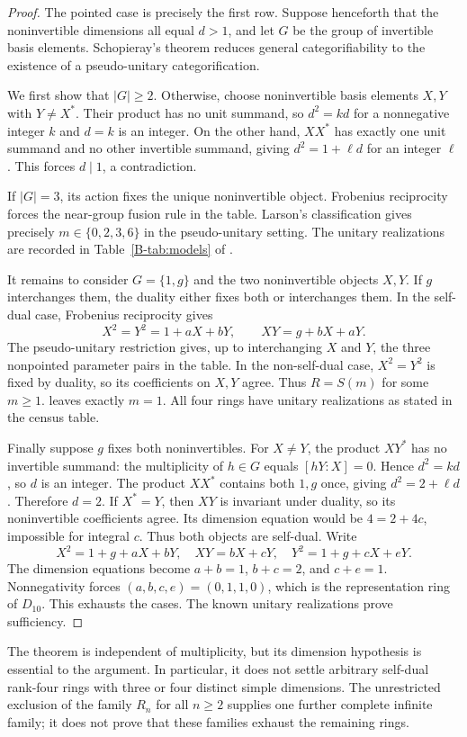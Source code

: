 \begin{proof}
The pointed case is precisely the first row. Suppose henceforth that the
noninvertible dimensions all equal $d>1$, and let $G$ be the group of
invertible basis elements. Schopieray's theorem
\cite[Lemma~3.1]{Schopieray} reduces general categorifiability to the
existence of a pseudo-unitary categorification.

We first show that $|G|\geq2$. Otherwise, choose noninvertible basis
elements $X,Y$ with $Y\ne X^*$. Their product has no unit summand, so
$d^2=kd$ for a nonnegative integer $k$ and $d=k$ is an integer. On the
other hand, $XX^*$ has exactly one unit summand and no other invertible
summand, giving $d^2=1+\ell d$ for an integer $\ell$. This forces $d\mid1$,
a contradiction.

If $|G|=3$, its action fixes the unique noninvertible object. Frobenius
reciprocity forces the near-group fusion rule in the table. Larson's
classification \cite[Theorem~1.1]{Larson} gives precisely
$m\in\{0,2,3,6\}$ in the pseudo-unitary setting. The unitary realizations
are recorded in Table~\ref{B-tab:models} of \cite{Finite}.

It remains to consider $G=\{1,g\}$ and the two noninvertible objects $X,Y$.
If $g$ interchanges them, the duality either fixes both or interchanges
them. In the self-dual case, Frobenius reciprocity gives
\[
 X^2=Y^2=1+aX+bY,\qquad XY=g+bX+aY.
\]
The pseudo-unitary restriction
\cite[Theorem~2.4]{EIP} gives, up to interchanging $X$ and $Y$, the
three nonpointed parameter pairs in the table. In the non-self-dual case,
$X^2=Y^2$ is fixed by duality, so its coefficients on $X,Y$ agree. Thus
$R=S(m)$ for some $m\geq1$. \cite[Theorem~\ref{B-thm:nonselfdual-quadratic}]{Finite}
leaves exactly $m=1$. All four rings have unitary realizations as stated
in the census table.

Finally suppose $g$ fixes both noninvertibles. For $X\ne Y$, the product
$XY^*$ has no invertible summand: the multiplicity of $h\in G$ equals
$[hY:X]=0$. Hence $d^2=kd$, so $d$ is an integer. The product $XX^*$
contains both $1,g$ once, giving $d^2=2+\ell d$. Therefore $d=2$.
If $X^*=Y$, then $XY$ is invariant under duality, so its noninvertible
coefficients agree. Its dimension equation would be $4=2+4c$, impossible
for integral $c$. Thus both objects are self-dual. Write
\[
 X^2=1+g+aX+bY,\quad XY=bX+cY,\quad
 Y^2=1+g+cX+eY.
\]
The dimension equations become
$a+b=1$, $b+c=2$, and $c+e=1$. Nonnegativity forces
$(a,b,c,e)=(0,1,1,0)$, which is the representation ring of $D_{10}$.
This exhausts the cases. The known unitary realizations prove sufficiency.
\end{proof}

\begin{remark}
The theorem is independent of multiplicity, but its dimension hypothesis
is essential to the argument. In particular, it does not settle arbitrary
self-dual rank-four rings with three or four distinct simple dimensions.
The unrestricted exclusion of the family $R_n$ for all $n\geq2$ supplies
one further complete infinite family; it does not prove that these families
exhaust the remaining rings.
\end{remark}
